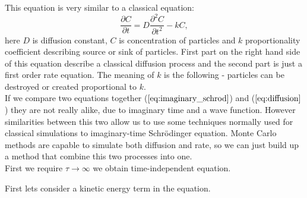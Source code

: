 \documentclass[twoside,english]{uiofysmaster}
\theoremstyle{definition}
\begin{document}
This equation is very similar to a classical equation:
\begin{equation}\label{eq:diffusion}
\frac{\partial C }{ \partial t} = D \frac{\partial^2 C }{ \partial t^2} - kC,
\end{equation}
here $D$ is diffusion constant, $C$ is concentration of particles and $k$ proportionality coefficient describing source or sink of particles. First part on the right hand side of this equation describe a classical diffusion process and the second part is just a first order rate equation. The meaning of $k$ is the following - particles can be destroyed or created proportional to $k$.\\
If we compare two equations together ($\ref{eq:imaginary_schrod}$) and ($\ref{eq:diffusion}$) they are not really alike, due to imaginary time and a wave function. However similarities between this two allow us to use some techniques normally used for classical simulations to imaginary-time Schrödinger equation. Monte Carlo methods are capable to simulate both diffusion and rate, so we can just build up a method that combine this two processes into one.  \\
First we require $\tau \rightarrow \infty $ we obtain time-independent equation. 


First lets consider a kinetic energy term in the equation. 
\end{document}
